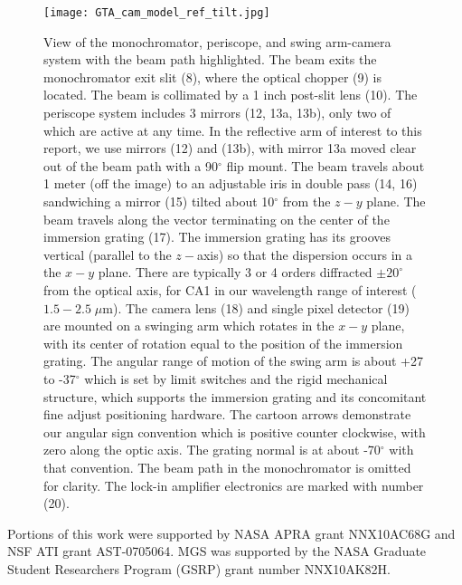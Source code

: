 \documentclass[]{spie}
\begin{document}
\begin{figure}
\begin{center}
    \texttt{[image: GTA\_cam\_model\_ref\_tilt.jpg]}
  \end{center}
  \caption[View of the monochromator, periscope, and swing arm-camera system with the beam path highlighted]{\label{fig:GTAview} View of the monochromator, periscope, and swing arm-camera system with the beam path highlighted.  The beam exits the monochromator exit slit (8), where the optical chopper (9) is located.  The beam is collimated by a 1 inch post-slit lens (10).  The periscope system includes 3 mirrors (12, 13a, 13b), only two of which are active at any time.  In the reflective arm of interest to this report, we use mirrors (12) and (13b), with mirror 13a moved clear out of the beam path with a 90$^\circ$ flip mount.  The beam travels about 1 meter (off the image) to an adjustable iris in double pass (14, 16) sandwiching a mirror (15) tilted about 10$^\circ$ from the $z-y$ plane.  The beam travels along the vector terminating on the center of the immersion grating (17).  The immersion grating has its grooves vertical (parallel to the $z-$axis) so that the dispersion occurs in a the $x-y$ plane.  There are typically 3 or 4 orders diffracted $\pm20^\circ$ from the optical axis, for CA1 in our wavelength range of interest ($1.5-2.5 \; \mu$m).  The camera lens (18) and single pixel detector (19) are mounted on a swinging arm which rotates in the $x-y$ plane, with its center of rotation equal to the position of the immersion grating.  The angular range of motion of the swing arm is about +27 to -37$^\circ$ which is set by limit switches and the rigid mechanical structure, which supports the immersion grating and its concomitant fine adjust positioning hardware.  The cartoon arrows demonstrate our angular sign convention which is positive counter clockwise, with zero along the optic axis.  The grating normal is at about -70$^\circ$ with that convention.  The beam path in the monochromator is omitted for clarity.  The lock-in amplifier electronics are marked with number (20).}
\end{figure}


\acknowledgments     %
 
Portions of this work were supported by NASA APRA grant NNX10AC68G and NSF ATI grant AST-0705064.  MGS was supported by the NASA Graduate Student Researchers Program (GSRP) grant number NNX10AK82H.


\end{document}
